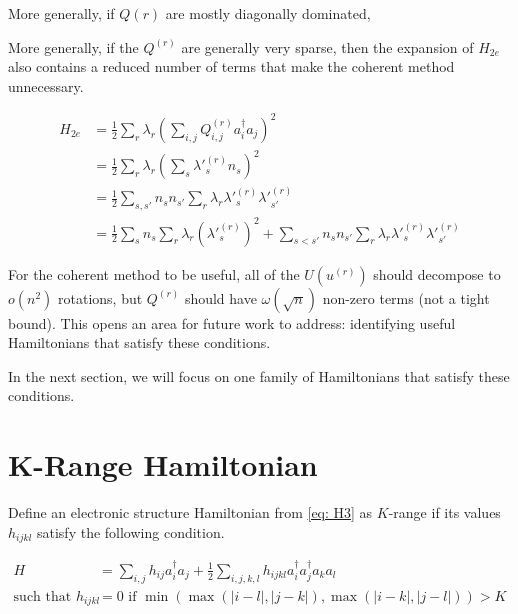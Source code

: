 More generally, if $Q{(r)}$ are mostly diagonally dominated,

More generally, if the $Q^{(r)}$ are generally very sparse, then the expansion of $H_{2e}$ also contains a reduced number of terms that make the coherent method unnecessary.

\begin{equation}
    \begin{split}
        H_{2e} &= \frac{1}{2}\sum_r\lambda_r\left(\sum_{i,j} Q^{(r)}_{i, j}a^\dag_ia_j\right)^2 \\
        &= \frac{1}{2}\sum_r\lambda_r(\sum_{s} \lambda'^{(r)}_sn_s)^2 \\
        &= \frac{1}{2}\sum_{s, s'} n_sn_{s'}\sum_r\lambda_r\lambda'^{(r)}_s\lambda'^{(r)}_{s'} \\
        &= \frac{1}{2}\sum_s n_s\sum_r\lambda_r(\lambda'^{(r)}_s)^2 + \sum_{s < s'} n_sn_{s'}\sum_r\lambda_r\lambda'^{(r)}_s\lambda'^{(r)}_{s'}
    \end{split}
    \label{eq: sparse}
\end{equation}

For the coherent method to be useful, all of the $U(u^{(r)})$ should decompose to $o(n^2)$ rotations, but $Q^{(r)}$ should have $\omega(\sqrt{n})$ non-zero terms (not a tight bound). This opens an area for future work to address: identifying useful Hamiltonians that satisfy these conditions.

In the next section, we will focus on one family of Hamiltonians that satisfy these conditions.



\section{K-Range Hamiltonian}

Define an electronic structure Hamiltonian from \eqref{eq: H3} as $K$-range if its values $h_{ijkl}$ satisfy the following condition.

\begin{equation}
    \begin{split}
        H &= \sum_{i, j} h_{ij}a^\dag_ia_j + \frac{1}{2}\sum_{i,j,k,l} h_{ijkl}a^\dag_ia^\dag_ja_ka_l  \\
        \text{such that } h_{ijkl} &= 0 \text{ if } \min(\max(|i - l|, |j - k|), \max(|i - k|, |j - l|)) > K
    \end{split}
\end{equation}

